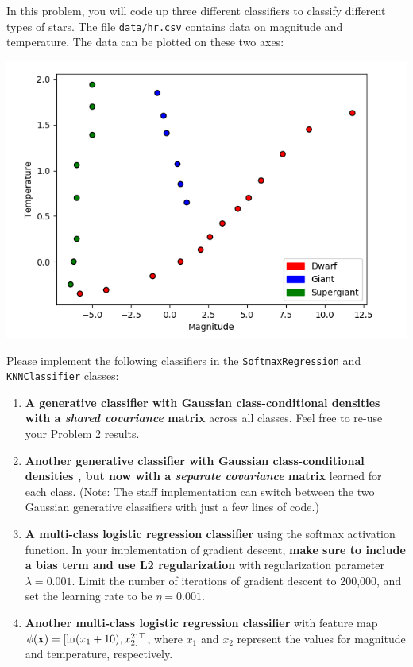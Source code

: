 \documentclass[submit]{harvardml}
\begin{document}

\begin{problem}
In this problem, you will code up three different classifiers to classify different types of stars. The file \verb|data/hr.csv| contains data on magnitude and temperature. The data can be plotted on these two axes:
\begin{center}
\includegraphics[width=.5\textwidth]{images/star.png}
\end{center}

Please implement the following classifiers in the \verb|SoftmaxRegression| and \verb|KNNClassifier| classes:

\begin{enumerate}[label=\alph*)]

\item \textbf{A generative classifier with Gaussian class-conditional
  densities with a \textit{shared covariance} matrix} across all classes. 
  Feel free to re-use your Problem 2 results.

\item \textbf{Another generative classifier with Gaussian class-conditional densities , but now 
with a \textit{separate covariance} matrix} learned for each class. (Note: 
The staff implementation can switch between the two Gaussian generative classifiers with just a
few lines of code.)

\item \textbf{A multi-class logistic regression classifier} using the softmax activation function. In your implementation of gradient descent, \textbf{make sure to include a bias term and use L2 regularization} with regularization parameter $\lambda = 0.001$. Limit the number of iterations of gradient descent to 200,000, and set the learning rate to be $\eta = 0.001$.

\item \textbf{Another multi-class logistic regression classifier} with feature map $\phi(\mathbf{x}) = [\ln (x_1 + 10), x_2^2]^\top$, where $x_1$ and $x_2$ represent the values for magnitude and temperature, respectively.


\end{enumerate}
\end{problem}
\end{document}
